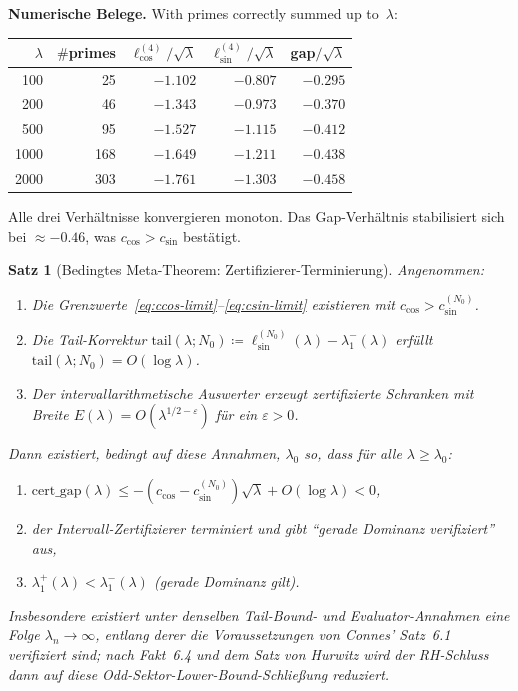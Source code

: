 ﻿\documentclass[12pt,a4paper]{article}
\newtheorem{theorem}{Satz}[section]
\theoremstyle{definition}
\theoremstyle{remark}
\begin{document}
\noindent\textbf{Numerische Belege.} With primes correctly summed up to~$\lambda$:

\begin{center}
\renewcommand{\arraystretch}{1.15}
\begin{tabular}{r|r|r|r|r}
$\lambda$ & $\#$primes & $\ell_{\cos}^{(4)}/\sqrt{\lambda}$ & $\ell_{\sin}^{(4)}/\sqrt{\lambda}$ & gap$/\sqrt{\lambda}$ \\\hline
100  & 25  & $-1.102$ & $-0.807$ & $-0.295$ \\
200  & 46  & $-1.343$ & $-0.973$ & $-0.370$ \\
500  & 95  & $-1.527$ & $-1.115$ & $-0.412$ \\
1000 & 168 & $-1.649$ & $-1.211$ & $-0.438$ \\
2000 & 303 & $-1.761$ & $-1.303$ & $-0.458$
\end{tabular}
\end{center}

\noindent Alle drei Verhältnisse konvergieren monoton. Das Gap-Verhältnis stabilisiert sich bei $\approx -0.46$, was $c_{\cos} > c_{\sin}$ bestätigt.

\begin{theorem}[Bedingtes Meta-Theorem: Zertifizierer-Terminierung]
\label{thm:meta}
Angenommen:
\begin{enumerate}[label=\textup{(M\arabic*)}]
  \item\label{M1} Die Grenzwerte~\eqref{eq:ccos-limit}--\eqref{eq:csin-limit} existieren mit $c_{\cos} > c_{\sin}^{(N_0)}$.
  \item\label{M2} Die Tail-Korrektur $\mathrm{tail}(\lambda; N_0) \coloneqq \ell_{\sin}^{(N_0)}(\lambda) - \lambda_1^-(\lambda)$ erfüllt $\mathrm{tail}(\lambda; N_0) = O(\log\lambda)$.
  \item\label{M3} Der intervallarithmetische Auswerter erzeugt zertifizierte Schranken mit Breite $E(\lambda) = O(\lambda^{1/2-\varepsilon})$ für ein $\varepsilon > 0$.
\end{enumerate}
Dann existiert, bedingt auf diese Annahmen, $\lambda_0$ so, dass für alle $\lambda \geq \lambda_0$:
\begin{enumerate}[label=\textup{(\roman*)}]
  \item $\mathrm{cert\_gap}(\lambda) \leq -(c_{\cos} - c_{\sin}^{(N_0)})\sqrt{\lambda} + O(\log\lambda) < 0$,
  \item der Intervall-Zertifizierer terminiert und gibt ``gerade Dominanz verifiziert'' aus,
  \item $\lambda_1^+(\lambda) < \lambda_1^-(\lambda)$ (gerade Dominanz gilt).
\end{enumerate}
Insbesondere existiert unter denselben Tail-Bound- und Evaluator-Annahmen eine Folge $\lambda_n \to \infty$, entlang derer die Voraussetzungen von Connes' Satz~6.1 verifiziert sind; nach Fakt~6.4 und dem Satz von Hurwitz wird der RH-Schluss dann auf diese Odd-Sektor-Lower-Bound-Schließung reduziert.
\end{theorem}
\end{document}
